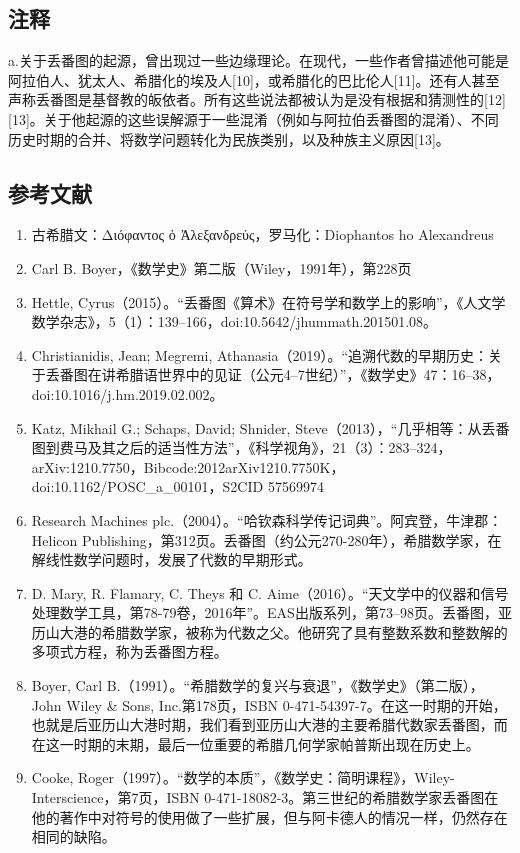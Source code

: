 \subsection{注释}  
a.关于丢番图的起源，曾出现过一些边缘理论。在现代，一些作者曾描述他可能是阿拉伯人、犹太人、希腊化的埃及人[10]，或希腊化的巴比伦人[11]。还有人甚至声称丢番图是基督教的皈依者。所有这些说法都被认为是没有根据和猜测性的[12][13]。关于他起源的这些误解源于一些混淆（例如与阿拉伯丢番图的混淆）、不同历史时期的合并、将数学问题转化为民族类别，以及种族主义原因[13]。
\subsection{参考文献}  
\begin{enumerate}
\item 古希腊文：Διόφαντος ὁ Ἀλεξανδρεύς，罗马化：Diophantos ho Alexandreus  
\item Carl B. Boyer，《数学史》第二版（Wiley，1991年），第228页  
\item Hettle, Cyrus（2015）。“丢番图《算术》在符号学和数学上的影响”，《人文学数学杂志》，5（1）：139–166，doi:10.5642/jhummath.201501.08。  
\item Christianidis, Jean; Megremi, Athanasia（2019）。“追溯代数的早期历史：关于丢番图在讲希腊语世界中的见证（公元4–7世纪）”，《数学史》47：16–38，doi:10.1016/j.hm.2019.02.002。  
\item Katz, Mikhail G.; Schaps, David; Shnider, Steve（2013），“几乎相等：从丢番图到费马及其之后的适当性方法”，《科学视角》，21（3）：283–324，arXiv:1210.7750，Bibcode:2012arXiv1210.7750K，doi:10.1162/POSC_a_00101，S2CID 57569974  
\item Research Machines plc.（2004）。“哈钦森科学传记词典”。阿宾登，牛津郡：Helicon Publishing，第312页。丢番图（约公元270-280年），希腊数学家，在解线性数学问题时，发展了代数的早期形式。  
\item D. Mary, R. Flamary, C. Theys 和 C. Aime（2016）。“天文学中的仪器和信号处理数学工具，第78-79卷，2016年”。EAS出版系列，第73–98页。丢番图，亚历山大港的希腊数学家，被称为代数之父。他研究了具有整数系数和整数解的多项式方程，称为丢番图方程。  
\item Boyer, Carl B.（1991）。“希腊数学的复兴与衰退”，《数学史》（第二版），John Wiley & Sons, Inc.第178页，ISBN 0-471-54397-7。在这一时期的开始，也就是后亚历山大港时期，我们看到亚历山大港的主要希腊代数家丢番图，而在这一时期的末期，最后一位重要的希腊几何学家帕普斯出现在历史上。  
\item Cooke, Roger（1997）。“数学的本质”，《数学史：简明课程》，Wiley-Interscience，第7页，ISBN 0-471-18082-3。第三世纪的希腊数学家丢番图在他的著作中对符号的使用做了一些扩展，但与阿卡德人的情况一样，仍然存在相同的缺陷。

\end{enumerate}

